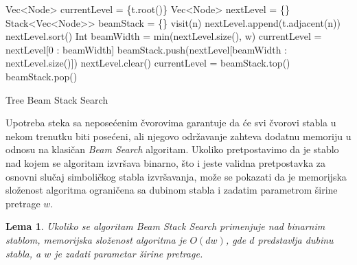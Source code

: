 \documentclass[a4paper]{article}
\newtheorem{lemma}[theorem]{Lema}
\begin{document}
\begin{algorithm}
    \begin{algorithmic}[1]
                \State Vec<Node> currentLevel = \{t.root()\}
                \State Vec<Node> nextLevel = \{\}
                \State Stack<Vec<Node>{>} beamStack = \{\}
                        \State visit(n)
                        \State nextLevel.append(t.adjacent(n))
                    \EndFor
                    \State nextLevel.sort()
                    \State Int beamWidth = min(nextLevel.size(), w)
                    \State currentLevel = nextLevel[0 : beamWidth]
                        \State beamStack.push(nextLevel[beamWidth : nextLevel.size()])
                    \EndIf
                    \State nextLevel.clear()
                        \State currentLevel = beamStack.top()
                        \State beamStack.pop()
                    \EndIf
                \EndWhile
            \EndProcedure
    \end{algorithmic}
    \caption{Tree Beam Stack Search}
    \label{alg:tree_beam_stack_search}
\end{algorithm}

Upotreba steka sa neposećenim čvorovima garantuje da će svi čvorovi stabla u nekom trenutku biti posećeni, ali njegovo održavanje zahteva dodatnu memoriju u odnosu na klasičan \textit{Beam Search} algoritam. Ukoliko pretpostavimo da je stablo nad kojem se algoritam izvršava binarno, što i jeste validna pretpostavka za osnovni slučaj simboličkog stabla izvršavanja, može se pokazati da je memorijska složenost algoritma ograničena sa dubinom stabla i zadatim parametrom širine pretrage $w$.

\begin{lemma}
Ukoliko se algoritam \textit{Beam Stack Search} primenjuje nad binarnim stablom, memorijska složenost algoritma je $O(dw)$, gde $d$ predstavlja dubinu stabla, a $w$ je zadati parametar širine pretrage.
\end{lemma}
\end{document}
